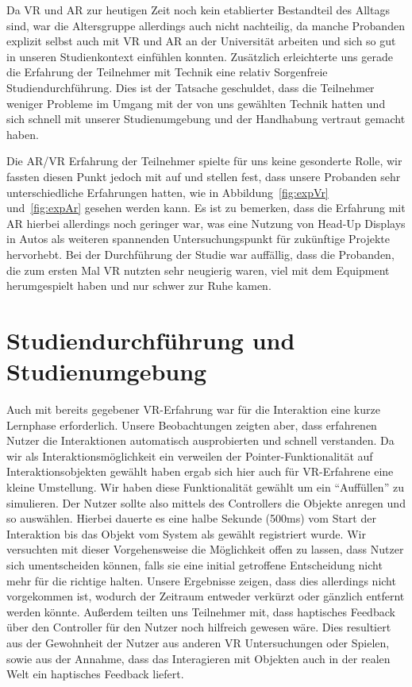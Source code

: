 Da VR und AR zur heutigen Zeit noch kein etablierter Bestandteil des Alltags sind, war die Altersgruppe allerdings auch nicht nachteilig, da manche Probanden explizit selbst auch mit VR und AR an der Universität arbeiten und sich so gut in unseren Studienkontext einfühlen konnten.
Zusätzlich erleichterte uns gerade die Erfahrung der Teilnehmer mit Technik eine relativ Sorgenfreie Studiendurchführung. Dies ist der Tatsache geschuldet, dass die Teilnehmer weniger Probleme im Umgang mit der von uns gewählten Technik hatten und sich schnell mit unserer Studienumgebung und der Handhabung vertraut gemacht haben.

Die AR/VR Erfahrung der Teilnehmer spielte für uns keine gesonderte Rolle, wir fassten diesen Punkt jedoch mit auf und stellen fest, dass unsere Probanden sehr unterschiedliche Erfahrungen hatten, wie in Abbildung~\ref{fig:expVr} und~\ref{fig:expAr} gesehen werden kann. Es ist zu bemerken, dass die Erfahrung mit AR hierbei allerdings noch geringer war, was eine Nutzung von Head-Up Displays in Autos als weiteren spannenden Untersuchungspunkt für zukünftige Projekte hervorhebt. 
Bei der Durchführung der Studie war auffällig, dass die Probanden, die zum ersten Mal VR nutzten sehr neugierig waren, viel mit dem Equipment herumgespielt haben und nur schwer zur Ruhe kamen.

\section{Studiendurchführung und Studienumgebung}

Auch mit bereits gegebener VR-Erfahrung war für die Interaktion eine kurze Lernphase erforderlich.
Unsere Beobachtungen zeigten aber, dass erfahrenen Nutzer die Interaktionen automatisch ausprobierten und schnell verstanden. 
Da wir als Interaktionsmöglichkeit ein verweilen der Pointer-Funktionalität auf Interaktionsobjekten gewählt haben ergab sich hier auch für VR-Erfahrene eine kleine Umstellung. Wir haben diese Funktionalität gewählt um ein "`Auffüllen"' zu simulieren. Der Nutzer sollte also mittels des Controllers die Objekte anregen und so auswählen.
Hierbei dauerte es eine halbe Sekunde (500ms) vom Start der Interaktion bis das Objekt vom System als gewählt registriert wurde. Wir versuchten mit dieser Vorgehensweise die Möglichkeit offen zu lassen, dass Nutzer sich umentscheiden können, falls sie eine initial getroffene Entscheidung nicht mehr für die richtige halten. 
Unsere Ergebnisse zeigen, dass dies allerdings nicht vorgekommen ist, wodurch der Zeitraum entweder verkürzt oder gänzlich entfernt werden könnte. 
Außerdem teilten uns Teilnehmer mit, dass haptisches Feedback über den Controller für den Nutzer noch hilfreich gewesen wäre. Dies resultiert aus der Gewohnheit der Nutzer aus anderen VR Untersuchungen oder Spielen, sowie aus der Annahme, dass das Interagieren mit Objekten auch in der realen Welt ein haptisches Feedback liefert.

